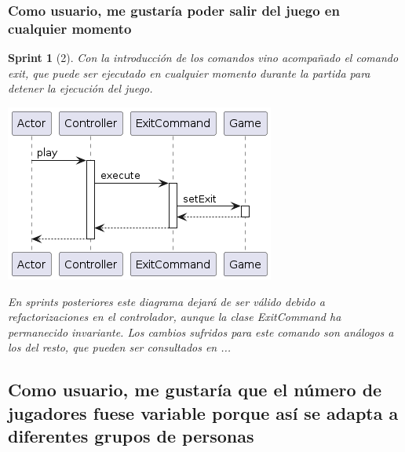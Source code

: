 \documentclass[12pt,a4paper,openright]{book}
\theoremstyle{break}
\newtheorem*{sprint}{Sprint}
\begin{document}
\subsubsection{Como usuario, me gustaría poder salir del juego en cualquier momento}
\begin{sprint}[2]
Con la introducción de los comandos vino acompañado el comando exit, que puede ser ejecutado en cualquier momento durante la partida para detener la ejecución del juego.

\begin{center}
\includegraphics[scale=0.5]{exit-sprint2.png}
\end{center}

En sprints posteriores este diagrama dejará de ser válido debido a refactorizaciones en el controlador, aunque la clase ExitCommand ha permanecido invariante. Los cambios sufridos para este comando son análogos a los del resto, que pueden ser consultados en ... %
\end{sprint}

\subsection{Como usuario, me gustaría que el número de jugadores fuese variable porque así se adapta a diferentes grupos de personas}
\end{document}
